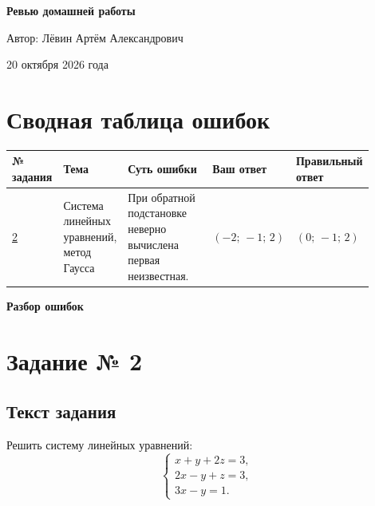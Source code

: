 \documentclass[12pt,a4paper]{article}
\begin{document}
\begin{titlepage}
\centering
\vspace*{0.28\textheight}
{\LARGE\bfseries Ревью домашней работы\par}
\vspace{22mm}
{\large Автор: Лёвин Артём Александрович\par}
\vspace{7mm}
{\large 20 октября 2026 года\par}
\vfill
{}
\vspace*{12mm}
\end{titlepage}

\newpage
\section*{Сводная таблица ошибок}
\small
\setlength{\tabcolsep}{3pt}
\renewcommand{\arraystretch}{1.35}
\begin{tabular}{@{}p{0.09\linewidth}p{0.17\linewidth}p{0.26\linewidth}p{0.20\linewidth}p{0.18\linewidth}@{}}
\toprule
\textbf{№ задания} & \textbf{Тема} & \textbf{Суть ошибки} & \textbf{Ваш ответ} & \textbf{Правильный ответ} \\
\midrule
\hyperref[task:2]{2} & Система линейных уравнений, метод Гаусса & При обратной подстановке неверно вычислена первая неизвестная. & $(-2;\,-1;\,2)$ & $(0;\,-1;\,2)$ \\
\bottomrule
\end{tabular}
\normalsize

\newpage
\thispagestyle{empty}
\vspace*{\fill}
\begin{center}
{\LARGE\bfseries Разбор ошибок}
\end{center}
\vspace*{\fill}
\newpage

\label{task:2}
\section*{Задание № 2}
\subsection*{Текст задания}
Решить систему линейных уравнений:
\[
\begin{cases}
 x+y+2z=3,\\
 2x-y+z=3,\\
 3x-y=1.
\end{cases}
\]
\end{document}
